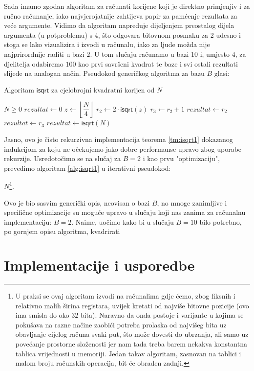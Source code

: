 \documentclass[12pt]{scrartcl}
\begin{document}
Sada imamo zgodan algoritam za računati korijene koji je direktno primjenjiv i za ručno računanje, iako najvjerojatnije zahtijeva papir
za pamćenje rezultata za veće argumente. Vidimo da algoritam napreduje dijeljenjem preostalog dijela argumenta (u potproblemu) s $4$, što
odgovara bitovnom posmaku za 2 udesno i stoga se lako vizualizira i izvodi u računalu, iako za ljude možda nije najprirordnije raditi u bazi $2$.
U tom slučaju računamo u bazi $10$ i, umjesto $4$, za djelitelja odabiremo $100$ kao prvi savršeni kvadrat te baze i svi ostali rezultati slijede
na analogan način. Pseudokod generičkog algoritma za bazu $B$ glasi:
\begin{algorithm}
    \caption{Algoritam $\mathsf{isqrt}$ za cjelobrojni kvadratni korijen od $N$}\label{alg:isqrt1}
    \begin{algorithmic}
    \Require $N \geq 0$
        \State $rezultat \gets 0$
    \Else
        \State $z \gets \left\lfloor\dfrac{N}{4}\right\rfloor$
        \State $r_2 \gets 2 \cdot \mathsf{isqrt}(z)$
        \State $r_3 \gets r_2 + 1$
            \State $rezultat \gets r_2$
        \Else
            \State $rezultat \gets r_3$
        \EndIf
    \EndIf
    \State $rezultat \gets \mathsf{isqrt}(N)$
    \end{algorithmic}
\end{algorithm}

Jasno, ovo je čisto rekurzivna implementacija teorema \eqref{tm:isqrt1} dokazanog indukcijom za koju ne očekujemo jako dobre performanse upravo zbog
uporabe rekurzije. Usredotočimo se na slučaj za $B=2$ i kao prvu "optimizaciju", prevedimo algoritam \ref{alg:isqrt1} u iterativni pseudokod:

$N$\footnote{U praksi se ovaj algoritam izvodi na računalima gdje ćemo, zbog fiksnih
i relativno malih širina registara, uvijek kretati od najviše bitovne pozicije (ovo ima smisla do oko $32$ bita).
Naravno da onda postoje i varijante u kojima se pokušava na razne načine
zaobići potreba prolaska od najvišeg bita uz obavljanje cijelog računa svaki put, što može dovesti do ubrzanja, ali samo uz povećanje
prostorne složenosti jer nam tada treba barem nekakva konstantna tablica vrijednosti u memoriji.
Jedan takav algoritam, zasnovan na tablici i malom broju računskih operacija,
bit će obrađen zadnji.}.

Ovo je bio sasvim generički opis, neovisan o bazi $B$, no mnoge zanimljive i specifične
 optimizacije su moguće upravo u slučaju koji nas zanima za računalnu implementaciju: $B=2$. Naime, uočimo kako bi u slučaju $B=10$ bilo potrebno,
 po gornjem opisu algoritma, kvadrirati 
\section{Implementacije i usporedbe}

\printbibliography
\end{document}
